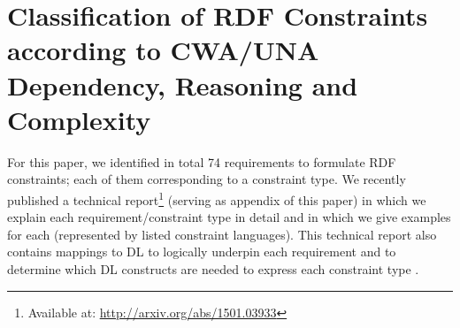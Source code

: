 \documentclass{llncs}
\newcommand{\ms}[1]{\texttt{#1}}
\newenvironment{DL}{
  \vspace{0cm}
  \begin{tabular}{r l}

}{
  \end{tabular}
}
\begin{document}
\section{Classification of RDF Constraints according to CWA/UNA Dependency, Reasoning and Complexity}
\label{classification-rdf-constraints}

For this paper, we identified in total 74 requirements to formulate RDF constraints; each of them corresponding to a constraint type. 
We recently published a technical report\footnote{Available at: \url{http://arxiv.org/abs/1501.03933}} (serving as appendix of this paper) in which we explain each requirement/constraint type in detail and in which we give examples for each (represented by listed constraint languages).
This technical report also contains mappings to DL to logically underpin each requirement and to determine which DL constructs are needed to express each constraint type \cite{BoschNolleAcarEckert2015}.
\end{document}
